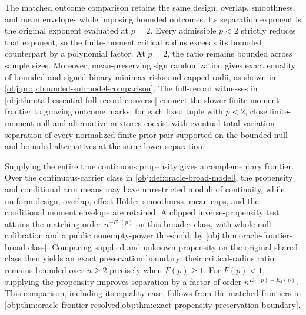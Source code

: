 The matched outcome comparison retains the same design, overlap, smoothness, and mean envelopes while imposing bounded outcomes. Its separation exponent is the original exponent evaluated at \(p=2\). Every admissible \(p<2\) strictly reduces that exponent, so the finite-moment critical radius exceeds its bounded counterpart by a polynomial factor. At \(p=2\), the ratio remains bounded across sample sizes. Moreover, mean-preserving sign randomization gives exact equality of bounded and signed-binary minimax risks and capped radii, as shown in \cref{obj:prop:bounded-submodel-comparison}. The full-record witnesses in \cref{obj:thm:tail-essential-full-record-converse} connect the slower finite-moment frontier to growing outcome marks: for each fixed tuple with \(p<2\), close finite-moment null and alternative mixtures coexist with eventual total-variation separation of every normalized finite prior pair supported on the bounded null and bounded alternatives at the same lower separation.

Supplying the entire true continuous propensity gives a complementary frontier. Over the continuous-carrier class in \cref{obj:def:oracle-broad-model}, the propensity and conditional arm means may have unrestricted moduli of continuity, while uniform design, overlap, effect Hölder smoothness, mean caps, and the conditional moment envelope are retained. A clipped inverse-propensity test attains the matching order \(n^{-E_0(p)}\) on this broader class, with whole-null calibration and a public nonempty-power threshold, by \cref{obj:thm:oracle-frontier-broad-class}. Comparing supplied and unknown propensity on the original shared class then yields an exact preservation boundary: their critical-radius ratio remains bounded over \(n\ge2\) precisely when \(F(p)\ge1\). For \(F(p)<1\), supplying the propensity improves separation by a factor of order \(n^{E_0(p)-E_4(p)}\). This comparison, including its equality case, follows from the matched frontiers in \cref{obj:thm:oracle-frontier-resolved,obj:thm:exact-propensity-preservation-boundary}.


